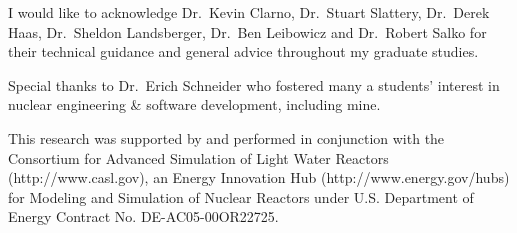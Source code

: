 
\acknowledgments

I would like to acknowledge Dr.~Kevin Clarno, Dr.~Stuart Slattery, Dr.~Derek Haas, Dr.~Sheldon Landsberger, Dr.~Ben Leibowicz and Dr.~Robert Salko for their technical guidance and general advice throughout my graduate studies.

Special thanks to Dr.~Erich Schneider who fostered many a students' interest in nuclear engineering \& software development, including mine.

This research was supported by and performed in conjunction with the Consortium for Advanced Simulation of Light Water Reactors (http://www.casl.gov), an Energy Innovation Hub (http://www.energy.gov/hubs) for Modeling and Simulation of Nuclear Reactors under U.S. Department of Energy Contract No. DE-AC05-00OR22725.
\newpage
